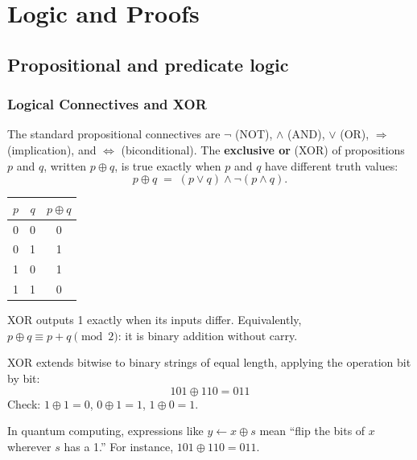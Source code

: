 
\section{Logic and Proofs}

\subsection{Propositional and predicate logic}

\subsubsection*{Logical Connectives and XOR}

\begin{definition}
The standard propositional connectives are $\neg$ (NOT), $\land$ (AND), $\lor$ (OR), $\Rightarrow$ (implication), and $\Leftrightarrow$ (biconditional). The \textbf{exclusive or} (XOR) of propositions $p$ and $q$, written $p \oplus q$, is true exactly when $p$ and $q$ have different truth values:
\[
p \oplus q \;=\; (p \lor q) \land \neg(p \land q).
\]
\end{definition}

\begin{remark}
\begin{center}
\begin{tabular}{c|c|c}
$p$ & $q$ & $p \oplus q$ \\
\hline
0 & 0 & 0 \\
0 & 1 & 1 \\
1 & 0 & 1 \\
1 & 1 & 0 \\
\end{tabular}
\end{center}
XOR outputs 1 exactly when its inputs differ. Equivalently, $p \oplus q \equiv p + q \pmod{2}$: it is binary addition without carry.
\end{remark}

\begin{example}
XOR extends bitwise to binary strings of equal length, applying the operation bit by bit:
\[
101 \oplus 110 = 011
\]
Check: $1\oplus1=0$, $0\oplus1=1$, $1\oplus0=1$.

In quantum computing, expressions like $y \leftarrow x \oplus s$ mean ``flip the bits of $x$ wherever $s$ has a 1.'' For instance, $101 \oplus 110 = 011$.
\end{example}

